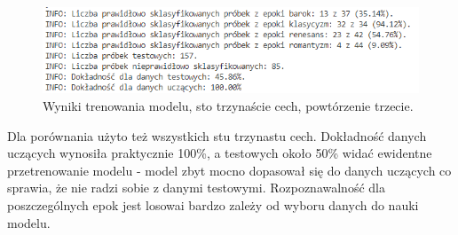 \documentclass[printmode, eng, openany]{mgr}
\newcommand\tab[1][1cm]{\hspace*{#1}}
\begin{document}
\begin{figure}[H]
\centering
\includegraphics[scale=0.9]{wyniki_all_2.png}
\caption{Wyniki trenowania modelu, sto trzynaście cech, powtórzenie trzecie.}
\end{figure}
\tab Dla porównania użyto też wszystkich stu trzynastu cech. Dokładność danych uczących wynosiła praktycznie 100\%, a testowych około 50\% widać ewidentne przetrenowanie modelu - model zbyt mocno dopasował się do danych uczących co sprawia, że nie radzi sobie z danymi testowymi. Rozpoznawalność dla poszczególnych epok jest losowa\linebreak i bardzo zależy od wyboru danych do nauki modelu.
\end{document}
